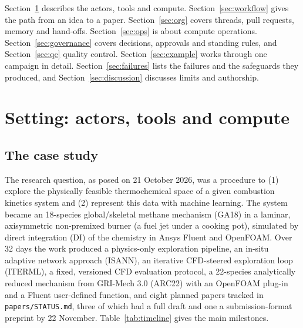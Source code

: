 \documentclass[preprint,review,12pt]{elsarticle}
\begin{document}
Section~\ref{sec:setting} describes the actors, tools and compute. Section~\ref{sec:workflow} gives the path from an
idea to a paper. Section~\ref{sec:org} covers threads, pull requests, memory and hand-offs. Section~\ref{sec:ops} is
about compute operations. Section~\ref{sec:governance} covers decisions, approvals and standing rules, and
Section~\ref{sec:qc} quality control. Section~\ref{sec:example} works through one campaign in detail.
Section~\ref{sec:failures} lists the failures and the safeguards they produced, and Section~\ref{sec:discussion}
discusses limits and authorship.

\section{Setting: actors, tools and compute}\label{sec:setting}

\subsection{The case study}\label{sec:case}
The research question, as posed on 21 October 2026, was a procedure to (1) explore the physically feasible
thermochemical space of a given combustion kinetics system and (2) represent this data with machine learning. The
system became an 18-species global/skeletal methane mechanism (GA18) in a laminar, axisymmetric non-premixed burner
(a fuel jet under a cooking pot), simulated by direct integration (DI) of the chemistry in Ansys Fluent and OpenFOAM.
Over 32 days the work produced a physics-only exploration pipeline, an in-situ adaptive network approach (ISANN), an
iterative CFD-steered exploration loop (ITERML), a fixed, versioned CFD evaluation protocol, a 22-species analytically
reduced mechanism from GRI-Mech 3.0 (ARC22) with an OpenFOAM plug-in and a Fluent user-defined function, and eight
planned papers tracked in \texttt{papers/STATUS.md}, three of which had a full draft and one a submission-format
preprint by 22 November. Table~\ref{tab:timeline} gives the main milestones.
\end{document}
